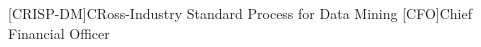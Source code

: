 \begin{acronym}[CRISP-DM]
[CRISP-DM]{CRoss-Industry Standard Process for Data Mining}
[CFO]{Chief Financial Officer}
\end{acronym}